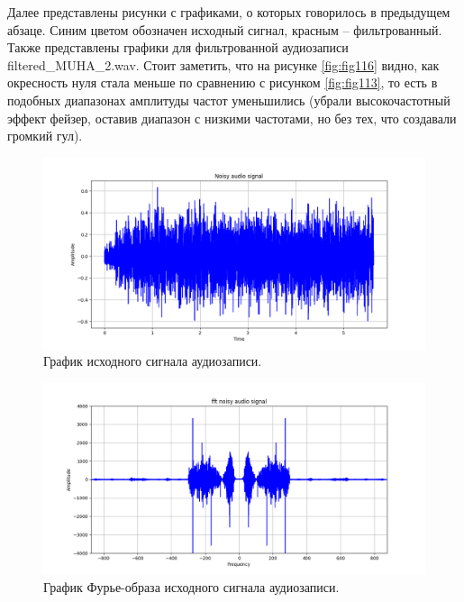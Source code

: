 \documentclass[a4paper, 12pt]{article}
\begin{document}
    Далее представлены рисунки с графиками, о которых говорилось в предыдущем абзаце. Синим цветом обозначен исходный сигнал,
    красным -- фильтрованный. Также представлены графики для фильтрованной аудиозаписи filtered\_{MUHA}\_{2}.wav. Стоит заметить,
    что на рисунке \ref{fig:fig116} видно, как окресность нуля стала меньше по сравнению с рисунком \ref{fig:fig113}, то есть в 
    подобных диапазонах амплитуды частот уменьшились (убрали высокочастотный эффект фейзер, оставив диапазон с низкими частотами, но
    без тех, что создавали громкий гул).


    \begin{figure}[!htb]
        \centering
        \includegraphics[scale=0.48]{noisy_audio.png}
        \captionsetup{skip=0pt}
        \caption{График исходного сигнала аудиозаписи.}
        \label{fig:fig111}
    \end{figure}
    \begin{figure}[!htb]
        \centering
        \includegraphics[scale=0.48]{U_audio.png}
        \captionsetup{skip=0pt}
        \caption{График Фурье-образа исходного сигнала аудиозаписи.}
        \label{fig:fig112}
    \end{figure}
\end{document}
